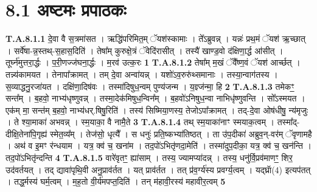 \documentclass[17pt]{extarticle}
\begin{document}
\section*{ 8.1     अष्टमः प्रपाठकः }
                                \textbf{ T.A.8.1.1} \newline
                  दे॒वा वै स॒त्रमा॑सत । ऋद्धि॑परिमित॒म् ॅयश॑स्कामाः । ते᳚ऽब्रुवन्न् । यन्नः॑ प्रथ॒मं ॅयश॑ ऋ॒च्छात् । सर्वे॑षा-न्न॒स्तथ्-स॒हास॒दिति॑ ।  तेषा᳚म् कुरुक्षे॒त्रं ॅवेदि॑रासीत् । तस्यै॑ खाण्ड॒वो द॑क्षिणा॒र्द्ध आ॑सीत् । तूर्घ्न॑मुत्तरा॒र्द्धः । प॒री॒णज्ज॑घना॒र्द्धः । म॒रव॑ उत्क॒रः \textbf{ 1} \newline
                  \newline
                                                                  \textbf{ T.A.8.1.2} \newline
                  तेषा᳚म् म॒खं ॅवै᳚ष्ण॒वं ॅयश॑ आर्च्छत् । तन्न्य॑कामयत । तेनापा᳚क्रामत् । तम् दे॒वा अन्वा॑यन्न् । यशो॑ऽव॒रुरु॑थ्समानाः । तस्या॒न्वाग॑तस्य ।  स॒व्याद्धनु॒रजा॑यत । दक्षि॑णा॒दिष॑वः । तस्मा॑दिषुध॒न्वम् पुण्य॑जन्म ।  य॒ज्ञ्ज॑न्मा॒ हि \textbf{ 2} \newline
                  \newline
                                                                  \textbf{ T.A.8.1.3} \newline
                  तमेकꣳ॒॒ सन्त᳚म् । ब॒हवो॒ नाभ्य॑धृष्णुवन्न् । तस्मा॒देक॑मिषुध॒न्विन᳚म् । ब॒हवो॑ऽनिषुध॒न्वा नाभिधृ॑ष्णुवन्ति । सो᳚ऽस्मयत । एक॑म् मा॒ सन्त॑म् ब॒हवो॒ नाभ्य॑धर्.षिषु॒रिति॑ ।  तस्य॑ सिष्मिया॒णस्य॒ तेजोऽपा᳚क्रामत् । तद्-दे॒वा ओष॑धीषु॒ न्य॑मृजुः । ते श्या॒माका॑ अभवन्न् । स्म॒याका॒ वै नामै॒ते \textbf{ 3} \newline
                  \newline
                                                                  \textbf{ T.A.8.1.4} \newline
                  तथ् स्म॒याका॑नाꣳ स्मयाक॒त्वम् । तस्मा᳚द्-दीक्षि॒तेना॑पि॒गृह्य॑ स्मेत॒व्य᳚म् । तेज॑सो॒ धृत्यै᳚ । स धनुः॑ प्रति॒ष्कभ्या॑तिष्ठत् । ता उ॑प॒दीका॑ अब्रुव॒न्-वर॑म् ॅवृणामहै । अथ॑ व इ॒मꣳ र॑न्धयाम ।  यत्र॒ क्व॑ च॒ खना॑म । तद॒पो॑ऽभितृ॑णदा॒मेति॑ ।  तस्मा॑दुप॒दीका॒ यत्र॒ क्व॑ च॒ खन॑न्ति । तद॒पो॑ऽभितृ॑न्दन्ति \textbf{ 4} \newline
                  \newline
                                                                  \textbf{ T.A.8.1.5} \newline
                  वारे॑वृतꣳ॒॒ ह्या॑साम् । तस्य॒ ज्यामप्या॑दन्न् ।  तस्य॒ धनु॑र्वि॒प्रव॑माणꣳ॒॒ शिर॒ उद॑वर्तयत् ।  तद् द्यावा॑पृथि॒वी अनु॒प्राव॑र्तत । यत् प्राव॑र्तत ।  तत् प्र॑व॒र्ग्य॑स्य प्रवर्ग्य॒त्वम् । यद्घ्राॅ(4) इत्यप॑तत् ।  तद्ध॒र्मस्य॑ घर्म॒त्वम् ।  म॒ह॒तो वी॒र्य॑मपप्त॒दिति॑ । तन् म॑हावी॒रस्य॑ महावीर॒त्वम् \textbf{ 5} \newline
\end{document}
